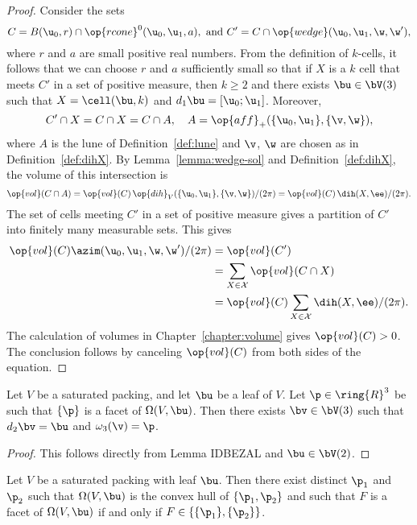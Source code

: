 \begin{proof} 
  Consider the sets
\[
C=B(\u_0,r)\cap \op{rcone}^0(\u_0,\u_1,a),\text{ and } C' = C\cap \op{wedge}(\u_0,\u_1,\w,\w') ,
\]
 where
  $r$ and $a$ are small positive real numbers.  From the definition of
  $k$-cells, it follows that we can choose $r$ and $a$ sufficiently
  small so that if $X$ is a $k$ cell that meets $C'$ in a set of
  positive measure, then $k\ge 2$ and there exists $\bu\in \bV(3)$
  such that $X=\cell(\bu,k)$ and $d_1\bu=[\u_0;\u_1]$.  Moreover,
\[
C'\cap X = C\cap X = C\cap A, \quad A=\op{aff}_+(\{\u_0,\u_1\},\{\v,\w\}),
\]
where $A$ is the lune of Definition~\ref{def:lune} and $\v$, $\w$ are
chosen as in Definition~\ref{def:dihX}.  By
Lemma~\ref{lemma:wedge-sol} and Definition~\ref{def:dihX}, the volume
of this intersection is
\[
\op{vol}(C\cap A) = \op{vol}(C)\,
 {\op{dih}_V(\{\u_0,\u_1\},\{\v,\w\}) }/{(2\pi)} =
  \op{vol}(C)\, {\dih(X,\ee)}/{(2\pi)}.
\]
The set of cells meeting $C'$ in a set of positive measure gives a 
partition of $C'$ into finitely many measurable sets.
This gives
\begin{align*}
\op{vol}(C) \azim(\u_0,\u_1,\w,\w')/(2\pi) &= 
\op{vol}(C') \\
&= \sum_{X\in\cX} \op{vol}(C\cap X)  \\
&= \op{vol}(C)\sum_{X\in\cX} \dih(X,\ee)/(2\pi).
\end{align*}
The calculation of volumes in Chapter~\ref{chapter:volume} gives
$\op{vol}(C)>0$.  The conclusion follows by canceling $\op{vol}(C)$
from both sides of the equation.
\end{proof}




\begin{lemma}\label{lemma:facetv}  Let $V$ be a saturated packing, and let $\bu$ be a leaf of $V$.  Let
$\p\in\ring{R}^3$ be such that $\{\p\}$ is a facet of $\Omega(V,\bu)$.  Then
there exists $\bv\in \bV(3)$ such that $d_2\bv = \bu$ and $\omega_3(\v)=\p$.
\end{lemma}

\begin{proof} This follows directly from Lemma IDBEZAL and $\bu\in \bV(2)$.
\end{proof}

\begin{lemma}\label{lemma:p1p2} Let $V$ be a saturated packing with leaf $\bu$.  Then there exist distinct $\p_1$ and $\p_2$ such
that $\Omega(V,\bu)$ is the convex hull of $\{\p_1,\p_2\}$ and such that
$F$ is a facet of $\Omega(V,\bu)$ if and only if $F\in \{\{\p_1\},\{\p_2\}\}$.
\end{lemma}


